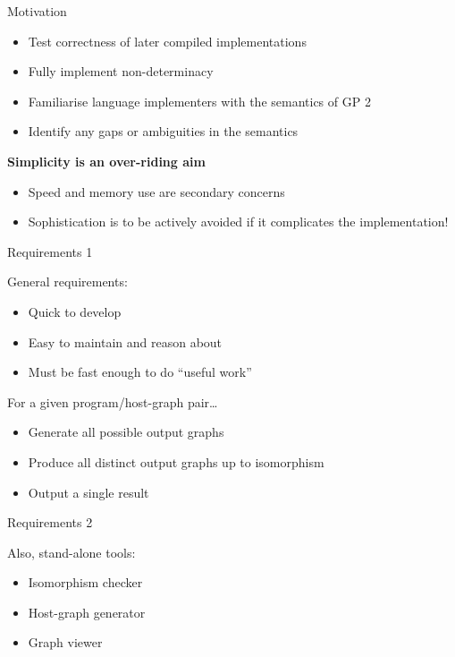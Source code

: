 \begin{frame}{Motivation}

\begin{itemize}
\itemsep1pt\parskip0pt
\item
  Test correctness of later compiled implementations
\item
  Fully implement non-determinacy
\item
  Familiarise language implementers with the semantics of GP 2
\item
  Identify any gaps or ambiguities in the semantics
\end{itemize}

\pause

\textbf{Simplicity is an over-riding aim}

\begin{itemize}
\itemsep1pt\parskip0pt
\item
  Speed and memory use are secondary concerns
\item
  Sophistication is to be actively avoided if it complicates the
  implementation!
\end{itemize}

\end{frame}

\begin{frame}{Requirements 1}

General requirements:

\begin{itemize}
\itemsep1pt\parskip0pt
\item
  Quick to develop 
\item
  Easy to maintain and reason about
\item
  Must be fast enough to do ``useful work''
\end{itemize}

\pause

For a given program/host-graph pair\ldots{}

\begin{itemize}
\itemsep1pt\parskip0pt
\item
  Generate all possible output graphs 
\item
  Produce all distinct output graphs up to isomorphism 
\item
  Output a single result 
\end{itemize}

\end{frame}

\begin{frame}{Requirements 2}

Also, stand-alone tools:

\begin{itemize}
\itemsep1pt\parskip0pt
\item
  Isomorphism checker
\item
  Host-graph generator
\item
  Graph viewer
\end{itemize}

\end{frame}

